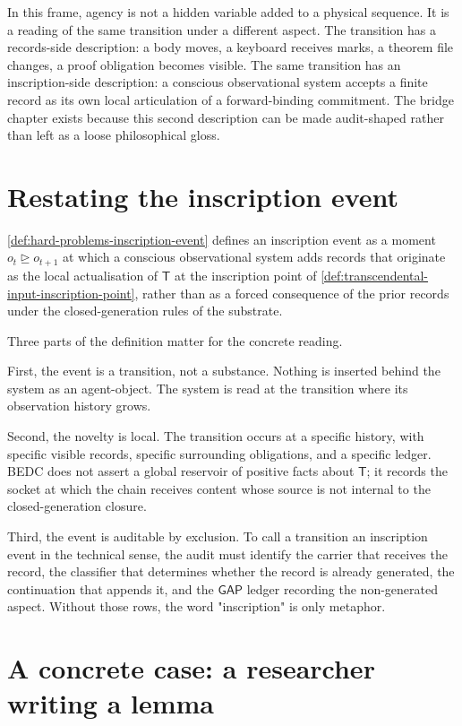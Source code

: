 In this frame, agency is not a hidden variable added to a physical sequence.
It is a reading of the same transition under a different aspect.  The
transition has a records-side description: a body moves, a keyboard receives
marks, a theorem file changes, a proof obligation becomes visible.  The same
transition has an inscription-side description: a conscious observational
system accepts a finite record as its own local articulation of a
forward-binding commitment.  The bridge chapter exists because this second
description can be made audit-shaped rather than left as a loose
philosophical gloss.

\section{Restating the inscription event}
\label{sec:inscription-event-restatement}

\autoref{def:hard-problems-inscription-event} defines an inscription event as
a moment $o_t \trianglerighteq o_{t+1}$ at which a conscious observational
system adds records that originate as the local actualisation of
$\mathsf{T}$ at the inscription point of
\autoref{def:transcendental-input-inscription-point}, rather than as a forced
consequence of the prior records under the closed-generation rules of the
substrate.

Three parts of the definition matter for the concrete reading.

First, the event is a transition, not a substance.  Nothing is inserted
behind the system as an agent-object.  The system is read at the transition
where its observation history grows.

Second, the novelty is local.  The transition occurs at a specific history,
with specific visible records, specific surrounding obligations, and a
specific ledger.  BEDC does not assert a global reservoir of positive facts
about $\mathsf{T}$; it records the socket at which the chain receives content
whose source is not internal to the closed-generation closure.

Third, the event is auditable by exclusion.  To call a transition an
inscription event in the technical sense, the audit must identify the carrier
that receives the record, the classifier that determines whether the record
is already generated, the continuation that appends it, and the
$\mathsf{GAP}$ ledger recording the non-generated aspect.  Without those
rows, the word "inscription" is only metaphor.

\section{A concrete case: a researcher writing a lemma}
\label{sec:inscription-event-researcher-lemma}

